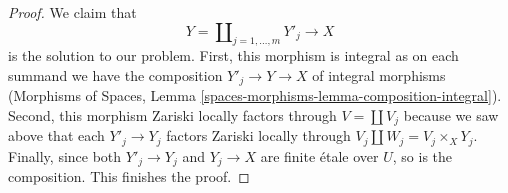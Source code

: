 \documentclass[10pt,a4paper]{amsart}
\theoremstyle{plain}
\theoremstyle{definition}
\theoremstyle{remark}
\numberwithin{equation}{subsection}
\begin{document}
\begin{proof}
\medskip\noindent
We claim that
$$
Y = \coprod\nolimits_{j = 1, \ldots, m} Y'_j \longrightarrow X
$$
is the solution to our problem. First, this morphism is integral
as on each summand we have the composition $Y'_j \to Y \to X$
of integral morphisms (Morphisms of Spaces, Lemma
\ref{spaces-morphisms-lemma-composition-integral}). Second, this
morphism Zariski locally factors through $V = \coprod V_j$ because
we saw above that each $Y'_j \to Y_j$ factors Zariski locally through
$V_j \amalg W_j = V_j \times_X Y_j$. Finally, since both
$Y'_j \to Y_j$ and $Y_j \to X$ are finite \'etale over
$U$, so is the composition. This finishes the proof.
\end{proof}



\end{document}
